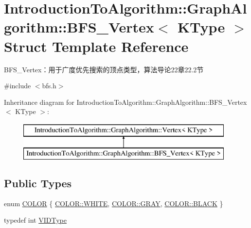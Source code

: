 \hypertarget{struct_introduction_to_algorithm_1_1_graph_algorithm_1_1_b_f_s___vertex}{}\section{Introduction\+To\+Algorithm\+:\+:Graph\+Algorithm\+:\+:B\+F\+S\+\_\+\+Vertex$<$ K\+Type $>$ Struct Template Reference}
\label{struct_introduction_to_algorithm_1_1_graph_algorithm_1_1_b_f_s___vertex}


B\+F\+S\+\_\+\+Vertex：用于广度优先搜索的顶点类型，算法导论22章22.2节  




{\ttfamily \#include $<$bfs.\+h$>$}

Inheritance diagram for Introduction\+To\+Algorithm\+:\+:Graph\+Algorithm\+:\+:B\+F\+S\+\_\+\+Vertex$<$ K\+Type $>$\+:\begin{figure}[H]
\begin{center}
\leavevmode
\includegraphics[height=2.000000cm]{struct_introduction_to_algorithm_1_1_graph_algorithm_1_1_b_f_s___vertex}
\end{center}
\end{figure}
\subsection*{Public Types}
\begin{DoxyCompactItemize}
\item 
enum \hyperlink{struct_introduction_to_algorithm_1_1_graph_algorithm_1_1_b_f_s___vertex_a3f00f12565def71750f1f163e0e52305}{C\+O\+L\+O\+R} \{ \hyperlink{struct_introduction_to_algorithm_1_1_graph_algorithm_1_1_b_f_s___vertex_a3f00f12565def71750f1f163e0e52305ab5bf627e448384cf3a4c35121ca6008d}{C\+O\+L\+O\+R\+::\+W\+H\+I\+T\+E}, 
\hyperlink{struct_introduction_to_algorithm_1_1_graph_algorithm_1_1_b_f_s___vertex_a3f00f12565def71750f1f163e0e52305a48bf014c704c9eaae100a98006a37bf7}{C\+O\+L\+O\+R\+::\+G\+R\+A\+Y}, 
\hyperlink{struct_introduction_to_algorithm_1_1_graph_algorithm_1_1_b_f_s___vertex_a3f00f12565def71750f1f163e0e52305a08d0012388564e95c3b4a7407cf04965}{C\+O\+L\+O\+R\+::\+B\+L\+A\+C\+K}
 \}
\item 
typedef int \hyperlink{struct_introduction_to_algorithm_1_1_graph_algorithm_1_1_b_f_s___vertex_a62cef758843cdaeefae2fc196f6bdb46}{V\+I\+D\+Type}
\end{DoxyCompactItemize}
